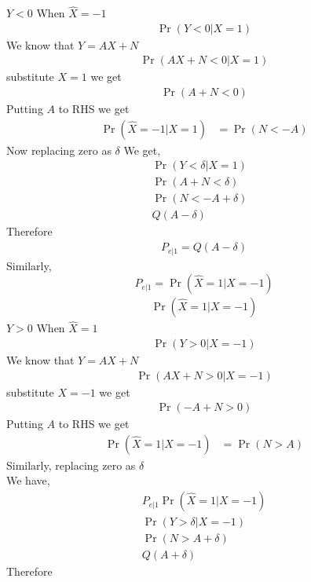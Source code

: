 \documentclass[journal,15pt,twocolumn]{IEEEtran}
\providecommand{\pr}[1]{\ensuremath{\Pr\left(#1\right)}}
\begin{document}
\begin{enumerate}
$Y < 0$ When $\hat{X} = -1$ 
 \begin{align}
        \pr{Y < 0|X=1} 
 \end{align}
         We know that $Y=AX+N$ 
\begin{align}
	 \pr{AX + N < 0|X=1}
\end{align}
  substitute $X=1$ we get
  \begin{align}
	\pr{A + N < 0}
 \end{align}
  Putting $A$ to RHS we get
  \begin{align}
	\pr{\hat{X} = -1|X=1} &= \pr{N < -A}
   \end{align} \vspace{2mm}
   Now replacing zero as $\delta$ 
   We get,
   \begin{align}
       \pr{Y < \delta|X=1}&\\
       \pr{A + N < \delta} \\
        \pr{N < -A + \delta}&\\
         Q(A-\delta)
\end{align}
Therefore 
\begin{align}
    P_{e|1}=Q(A-\delta)
\end{align}
Similarly, 
\begin{equation}
	P_{e|1} = \pr{\hat{X} = 1|X=-1}
\end{equation}
\begin{align}
	\pr{\hat{X} = 1|X=-1} 
  \end{align}
$Y > 0$ When $\hat{X} = 1$ 
 \begin{align}
        \pr{Y > 0|X=-1} 
 \end{align}
         We know that $Y=AX+N$ 
\begin{align}
	 \pr{AX + N > 0|X=-1}
\end{align}
  substitute $X=-1$ we get
  \begin{align}
	\pr{-A + N > 0}
 \end{align}
  Putting $A$ to RHS we get
  \begin{align}
	\pr{\hat{X} = 1|X=-1} &= \pr{N > A}
   \end{align} 
   Similarly, replacing zero as $\delta$ \\
   We have,
\begin{align}
	P_{e|1} \pr{\hat{X} = 1|X=-1}\\
	\pr{Y > \delta|X=-1}\\
	\pr{N > A + \delta}\\
	Q(A+\delta)
 \end{align}
 Therefore
 \begin{align}

\end{align}
\end{enumerate}
\end{document}
